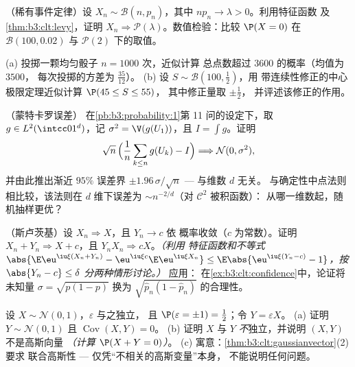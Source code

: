 \begin{exercise}[$\star\star$]\label{exo:b3:clt:5}
（稀有事件定律）设 $X_n \sim \mathcal B(n, p_n)$，其中
$np_n \to \lambda > 0$。利用特征函数
及\cref{thm:b3:clt:levy}，证明 $X_n \Rightarrow \mathcal
P(\lambda)$。数值检验：比较 $\P(X = 0)$
在 $\mathcal B(100, 0.02)$ 与 $\mathcal P(2)$ 下的取值。
\end{exercise}

\begin{exercise}[$\star\star$]\label{exo:b3:clt:6}
(a) 投掷一颗均匀骰子 $n = 1000$ 次，近似计算
总点数超过 $3600$ 的概率（均值为 $3500$，
每次投掷的方差为 $\frac{35}{12}$）。
(b) 设 $S \sim \mathcal B(100, \frac12)$，用
带连续性修正的中心极限定理近似计算 $\P(45 \leq S \leq 55)$，
其中修正量取 $\pm\frac12$，
并评述该修正的作用。
\end{exercise}

\begin{exercise}[$\star\star$]\label{exo:b3:clt:7}
（蒙特卡罗误差）
在\cref{pb:b3:probability:1}第 11 问的设定下，取 $g \in
L^2(\intcc01^d)$，记 $\sigma^2 = \V(g(U_1))$，且 $I = \int
g$。证明
\[
\sqrt n\,\Bigl(\frac1n\sum_{k\leq n}g(U_k) - I\Bigr)
\Longrightarrow \mathcal N(0, \sigma^2),
\]
并由此推出渐近 $95\%$ 误差界 $\pm
1.96\,\sigma/\sqrt n$ --- 与维数 $d$ 无关。
与确定性中点法则相比较，该法则在
$d$ 维下误差为 $\sim n^{-2/d}$（对 $\mathcal C^2$ 被积函数）：
从哪一维数起，随机抽样更优？
\end{exercise}

\begin{exercise}[$\star\star\star$]\label{exo:b3:clt:8}
（斯卢茨基）设 $X_n \Rightarrow X$，且 $Y_n \to c$ 依
概率收敛（$c$ 为常数）。证明 $X_n + Y_n \Rightarrow X +
c$，且 $Y_nX_n \Rightarrow cX$。\emph{（利用
特征函数和不等式 $\abs{\E\eu^{\iu\xi
(X_n+Y_n)} - \eu^{\iu\xi c}\E\eu^{\iu\xi X_n}} \leq
\E\abs{\eu^{\iu\xi(Y_n - c)} - 1}$，按 $\abs{Y_n - c}
\leq \delta$ 分两种情形讨论。）} 应用：
在\cref{ex:b3:clt:confidence}中，论证将未知量
$\sigma = \sqrt{p(1-p)}$ 换为 $\sqrt{\hat p_n(1 - \hat
p_n)}$ 的合理性。
\end{exercise}

\begin{exercise}[$\star\star\star$]\label{exo:b3:clt:9}
设 $X \sim \mathcal N(0,1)$，$\varepsilon$ 与之独立，
且 $\P(\varepsilon = \pm1) = \frac12$；令 $Y =
\varepsilon X$。
(a) 证明 $Y \sim \mathcal N(0,1)$ 且
$\operatorname{Cov}(X, Y) = 0$。
(b) 证明 $X$ 与 $Y$ \emph{不}独立，并说明
$(X, Y)$ 不是高斯向量 \emph{（计算 $\P(X + Y =
0)$）}。
(c) 寓意：\cref{thm:b3:clt:gaussianvector}(2) 要求
联合高斯性 --- 仅凭“不相关的高斯变量”本身，
不能说明任何问题。
\end{exercise}

